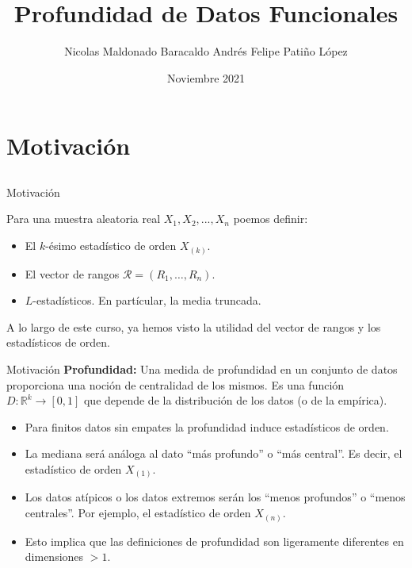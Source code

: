 \documentclass[10pt]{beamer}
\title{Profundidad de Datos Funcionales}
\date{Noviembre 2021}
\author{Nicolas Maldonado Baracaldo \newline 
Andrés Felipe Patiño López}
\institute{Departamento de Matemáticas\\Facultad de Ciencias\\Universidad de los Andes}
\begin{document}
\maketitle
{
{\fontsize{10}{12}\selectfont


\section[Motivación]{Motivación}
\subsection{}

\begin{frame}{Motivación}


Para una muestra aleatoria real $X_1,X_2,...,X_n$ poemos definir:\pause
\begin{itemize}
    \item El $k$-ésimo estadístico de orden $X_{(k)}$.\pause
    \item El vector de rangos $\mathcal{R}=(R_1,\ldots,R_n)$. \pause
    \item $L$-estadísticos. En partícular, la media truncada. 
\end{itemize}

A lo largo de este curso, ya hemos visto la utilidad del vector de rangos y los estadísticos de orden.


\end{frame}

\begin{frame}{Motivación}
    \textbf{Profundidad:} Una medida de profundidad en un conjunto de datos proporciona una noción de centralidad de los mismos. Es una función $D:\mathbb{R}^k\to[0,1]$ que depende de la distribución de los datos (o de la empírica).\pause 
    \begin{itemize}
        \item Para finitos datos sin empates la profundidad induce estadísticos de orden.\pause
        \item La mediana será análoga al dato ``más profundo'' o ``más central''. Es decir, el estadístico de orden $X_{(1)}$. \pause
        \item Los datos atípicos o los datos extremos serán los ``menos profundos'' o ``menos centrales''. Por ejemplo, el estadístico de orden $X_{(n)}$. \pause
        \item Esto implica que las definiciones de profundidad son ligeramente diferentes en dimensiones $>1$.
    \end{itemize}
\end{frame}

}}
\end{document}
